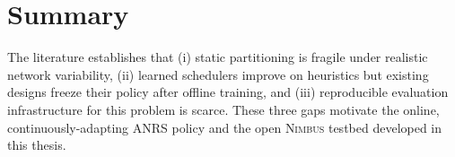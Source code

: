 \section{Summary}

The literature establishes that (i) static partitioning is fragile under realistic network variability, (ii) learned schedulers improve on heuristics but existing designs freeze their policy after offline training, and (iii) reproducible evaluation infrastructure for this problem is scarce. These three gaps motivate the online, continuously-adapting ANRS policy and the open \textsc{Nimbus} testbed developed in this thesis.

